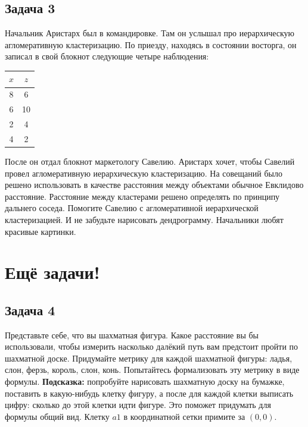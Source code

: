 \documentclass[12pt, a4paper, oneside]{article}
\begin{document}
\subsection*{Задача 3 }

Начальник Аристарх был в командировке. Там он услышал про иерархическую агломеративную кластеризацию. По приезду, находясь в состоянии восторга, он записал в свой блокнот следующие четыре наблюдения:

\begin{center}
\begin{tabular}{c|c}
	\hline
	$x$ & $z$ \\
	\hline
	8 & 6   \\
	6 & 10 \\
	2 & 4   \\
	4 & 2   \\
\end{tabular}
\end{center}

После он отдал блокнот маркетологу Савелию. Аристарх хочет, чтобы Савелий провел агломеративную иерархическую кластеризацию.  На совещаний было решено использовать в качестве расстояния между объектами обычное Евклидово расстояние. Расстояние между кластерами решено определять по принципу дальнего соседа. Помогите Савелию с агломеративной иерархической кластеризацией. И не забудьте нарисовать дендрограмму. Начальники любят красивые картинки. 




\section*{Ещё задачи!}

\subsection*{Задача 4} 

Представьте себе, что вы шахматная фигура. Какое расстояние вы бы использовали, чтобы измерить насколько далёкий путь вам предстоит пройти по шахматной доске.  Придумайте метрику для каждой шахматной фигуры: ладья, слон, ферзь, король, слон, конь. Попытайтесь формализовать эту метрику в виде формулы. \textbf{Подсказка:}  попробуйте нарисовать шахматную доску на бумажке, поставить в какую-нибудь клетку фигуру, а после для каждой клетки выписать цифру: сколько до этой клетки идти фигуре. Это поможет придумать для формулы общий вид. Клетку $a1$ в координатной сетки примите за $(0,0)$. 
\end{document}
